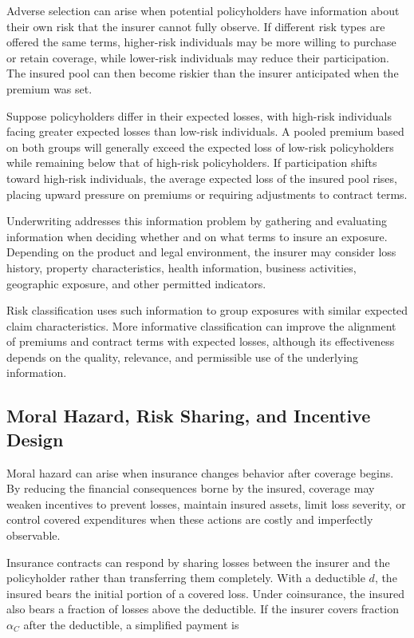 Adverse selection can arise when potential policyholders have information about their own risk that the insurer cannot fully observe. If different risk types are offered the same terms, higher-risk individuals may be more willing to purchase or retain coverage, while lower-risk individuals may reduce their participation. The insured pool can then become riskier than the insurer anticipated when the premium was set.

Suppose policyholders differ in their expected losses, with
high-risk individuals facing greater expected losses than
low-risk individuals. A pooled premium based on both groups
will generally exceed the expected loss of low-risk
policyholders while remaining below that of high-risk
policyholders. If participation shifts toward high-risk
individuals, the average expected loss of the insured pool
rises, placing upward pressure on premiums or requiring
adjustments to contract terms.

Underwriting addresses this information problem by gathering and evaluating information when deciding whether and on what terms to insure an exposure. Depending on the product and legal environment, the insurer may consider loss history, property characteristics, health information, business activities, geographic exposure, and other permitted indicators.

Risk classification uses such information to group exposures with similar expected claim characteristics. More informative classification can improve the alignment of premiums and contract terms with expected losses, although its effectiveness depends on the quality, relevance, and permissible use of the underlying information.


\subsection[Moral Hazard, Risk Sharing, and Incentive Design]{Moral Hazard, Risk Sharing, and Incentive \\Design}

Moral hazard can arise when insurance changes behavior after coverage begins. By reducing the financial consequences borne by the insured, coverage may weaken incentives to prevent losses, maintain insured assets, limit loss severity, or control covered expenditures when these actions are costly and imperfectly observable.

Insurance contracts can respond by sharing losses between the insurer and the policyholder rather than transferring them completely. With a deductible $d$, the insured bears the initial portion of a covered loss. Under coinsurance, the insured also bears a fraction of losses above the deductible. If the insurer covers fraction $\alpha_C$ after the deductible, a simplified payment is


